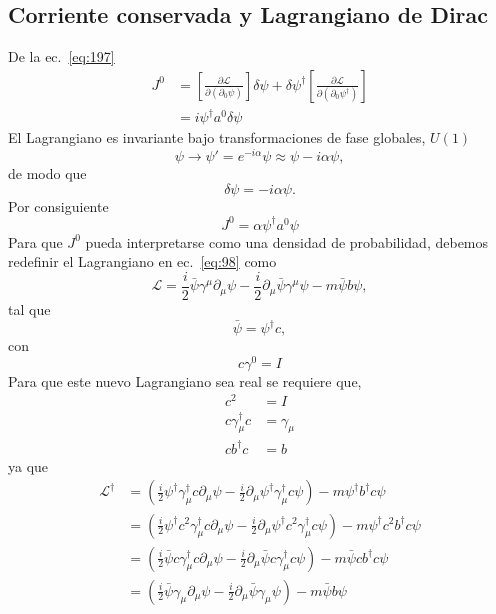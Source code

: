 \subsection{Corriente conservada y Lagrangiano de Dirac}
\label{sec:corriente-conservada}
De la ec.~\eqref{eq:197}
\begin{align}
  J^0&=\left[\frac{\partial\mathcal{L}}{\partial\left(\partial_0\psi\right)}\right]\delta\psi+\delta\psi^\dagger\left[\frac{\partial\mathcal{L}}{\partial\left(\partial_0\psi^\dagger\right)}\right]\nonumber\\
  &=i\psi^\dagger a^0 \delta\psi
\end{align}
El Lagrangiano es invariante bajo transformaciones de fase globales, $U(1)$
\begin{equation}
  \psi\to\psi'=e^{-i\alpha}\psi\approx\psi-i\alpha\psi,
\end{equation}
de modo que
\begin{equation}
  \delta\psi=-i\alpha\psi.
\end{equation}
Por consiguiente
\begin{equation}
  J^0=\alpha\psi^\dagger a^0 \psi 
\end{equation}
Para que $J^0$ pueda interpretarse como una densidad de probabilidad, debemos redefinir el Lagrangiano en ec.~\eqref{eq:98} como
\begin{equation}
  \label{eq:113}
    \mathcal{L}=\frac{i}{2}\bar{\psi} \gamma^\mu\partial_\mu\psi-\frac{i}{2}\partial_\mu\bar \psi \gamma^\mu\psi-m\bar{\psi} b\psi,
\end{equation}
tal que
\begin{equation}
  \bar{\psi}=\psi^\dagger c,
\end{equation}
con
\begin{equation}
  c \gamma^0=I
\end{equation}
Para que este nuevo Lagrangiano sea real se requiere que,
\begin{align}
  c^2&=I\nonumber\\
  c \gamma_\mu^\dagger c&=\gamma_\mu\nonumber\\
  \label{eq:110}
  c b^\dagger c&=b
\end{align}
ya que
\begin{align*}
  \mathcal{L}^\dagger&=\left(\frac{i}{2}\psi^\dagger \gamma_\mu^\dagger c \partial_\mu\psi-\frac{i}{2}\partial_\mu\psi^\dagger \gamma_\mu^\dagger c\psi\right)-m\psi^\dagger b^\dagger c \psi\\
  &=\left(\frac{i}{2}\psi^\dagger c^2 \gamma_\mu^\dagger c \partial_\mu\psi-\frac{i}{2}\partial_\mu\psi^\dagger c^2 \gamma_\mu^\dagger c\psi\right)-m\psi^\dagger c^2 b^\dagger c \psi\\
  &=\left(\frac{i}{2}\bar{\psi} c \gamma_\mu^\dagger c \partial_\mu\psi-\frac{i}{2}\partial_\mu\bar{\psi}c \gamma_\mu^\dagger c\psi\right)-m\bar{\psi}c b^\dagger c \psi\\
  &=\left(\frac{i}{2}\bar{\psi} \gamma_\mu \partial_\mu\psi-\frac{i}{2}\partial_\mu\bar{\psi}\gamma_\mu \psi\right)-m\bar{\psi}b \psi
\end{align*}
